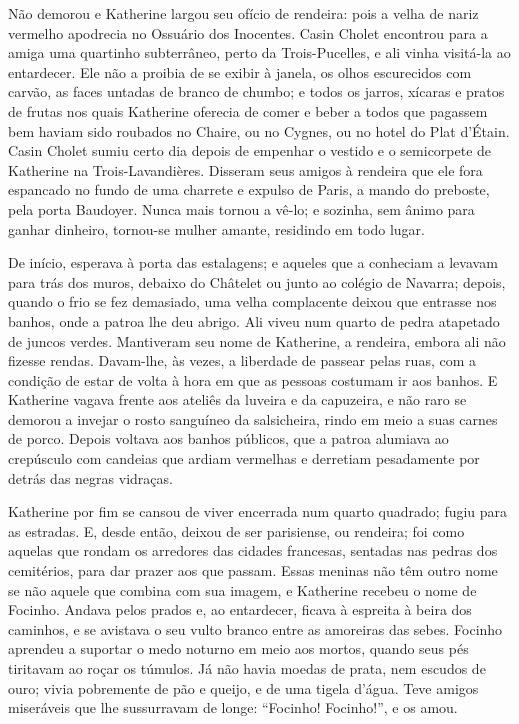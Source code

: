 Não demorou e Katherine largou seu ofício de rendeira: pois a velha de
nariz vermelho apodrecia no Ossuário dos Inocentes. Casin Cholet encontrou
para a amiga uma quartinho subterrâneo, perto da Trois-Pucelles, e ali
vinha visitá-la ao entardecer. Ele não a proibia de se exibir à janela, os
olhos escurecidos com carvão, as faces untadas de branco de chumbo; e
todos os jarros, xícaras e pratos de frutas nos quais Katherine oferecia
de comer e beber a todos que pagassem bem haviam sido roubados no Chaire,
ou no Cygnes, ou no hotel do Plat d’Étain. Casin Cholet sumiu certo dia
depois de empenhar o vestido e o semicorpete de Katherine na
Trois-Lavandières. Disseram seus amigos à rendeira que ele fora espancado
no fundo de uma charrete e expulso de Paris, a mando do preboste, pela
porta Baudoyer. Nunca mais tornou a vê-lo; e sozinha, sem ânimo para
ganhar dinheiro, tornou-se mulher amante, residindo em todo lugar.

De início, esperava à porta das estalagens; e aqueles que a conheciam a
levavam para trás dos muros, debaixo do Châtelet ou junto ao colégio de
Navarra; depois, quando o frio se fez demasiado, uma velha complacente
deixou que entrasse nos banhos, onde a patroa lhe deu abrigo. Ali viveu
num quarto de pedra atapetado de juncos verdes. Mantiveram seu nome de
Katherine, a rendeira, embora ali não fizesse rendas. Davam-lhe, às vezes,
a liberdade de passear pelas ruas, com a condição de estar de volta à hora
em que as pessoas costumam ir aos banhos. E Katherine vagava frente aos
ateliês da luveira e da capuzeira, e não raro se demorou a invejar o rosto
sanguíneo da salsicheira, rindo em meio a suas carnes de porco. Depois
voltava aos banhos públicos, que a patroa alumiava ao crepúsculo com
candeias que ardiam vermelhas e derretiam pesadamente por detrás das
negras vidraças.

Katherine por fim se cansou de viver encerrada num quarto quadrado; fugiu
para as estradas. E, desde então, deixou de ser parisiense, ou rendeira;
foi como aquelas que rondam os arredores das cidades francesas, sentadas
nas pedras dos cemitérios, para dar prazer aos que passam. Essas meninas
não têm outro nome se não aquele que combina com sua imagem, e Katherine
recebeu o nome de Focinho. Andava pelos prados e, ao entardecer, ficava à
espreita à beira dos caminhos, e se avistava o seu vulto branco entre as
amoreiras das sebes. Focinho aprendeu a suportar o medo noturno em meio
aos mortos, quando seus pés tiritavam ao roçar os túmulos. Já não havia
moedas de prata, nem escudos de ouro; vivia pobremente de pão e queijo, e
de uma tigela d’água. Teve amigos miseráveis que lhe sussurravam de longe:
“Focinho! Focinho!”, e os amou.

